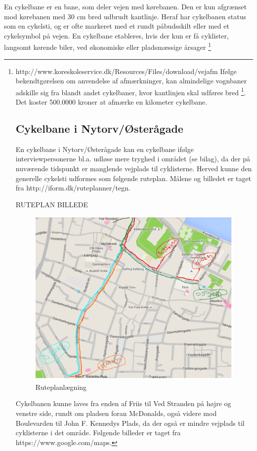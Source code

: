 En cykelbane er en bane, som deler vejen med kørebanen. Den er kun afgrænset mod kørebanen med 30 cm bred udbrudt kantlinje. Heraf har cykelbanen status som en cykelsti, og er ofte markeret med et rundt påbudsskilt eller med et cykelsymbol på vejen. En cykelbane etableres, hvis der kun er få cyklister, langsomt kørende biler, ved økonomiske eller pladsmæssige årsager \footnote{http://www.koreskoleservice.dk/Resources/Files/download/vejafm%
  Ifølge bekendtgørelsen om anvendelse af afmærkninger, kan almindelige vognbaner adskille sig fra blandt andet cykelbaner, hvor kantlinjen skal udføres bred \footnote{http://pvr.as/cykelstier-i-kobenhavn/ 03/12-2015}.  Det koster 500.0000 kroner at afmærke en kilometer cykelbane.  

\subsection{Cykelbane i Nytorv/Østerågade}
En cykelbane i Nytorv/Østerågade kan en cykelbane ifølge interviewpersonerne bl.a. udløse mere tryghed i området (se bilag), da der på nuværende tidspunkt er manglende vejplads til cyklisterne. Herved kunne den generelle cykelsti udformes som følgende ruteplan. Målene og billedet er taget fra http://iform.dk/ruteplanner/tegn.

RUTEPLAN BILLEDE
\begin{figure}[htbp]
   \label{fig:Ruteplan}
   \centering
   \begin{adjustbox}{max width=\textwidth}
     \includegraphics[scale=0.5]{billederogfigur/ruteplanlaegning.png}
  \end{adjustbox}
   \caption{Ruteplanlægning}
 \end{figure}
Cykelbanen kunne laves fra enden af Friis til Ved Stranden på højre og venstre side, rundt om pladsen foran McDonalds, også videre mod Boulevarden til John F. Kennedys Plads, da der også er mindre vejplads til cyklisterne i det område. Følgende billeder er taget fra https://www.google.com/maps. 

}
